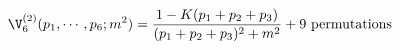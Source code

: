 \begin{equation}
\V_6^{(2)} (p_1,\cdots,p_6; m^2) = \frac{1 -
K(p_1+p_2+p_3)}{(p_1+p_2+p_3)^2 + m^2} + \text{9 permutations}
\end{equation}

